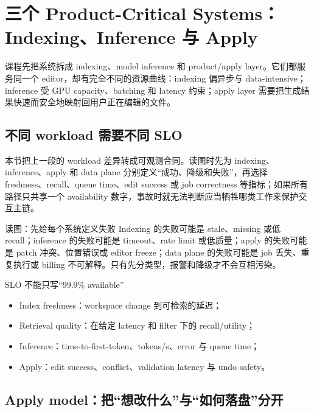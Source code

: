 \section{三个 Product-Critical Systems：Indexing、Inference 与 Apply}

课程先把系统拆成 indexing、model inference 和 product/apply layer。它们都服务同一个 editor，却有完全不同的资源曲线：indexing 偏异步与 data-intensive；inference 受 GPU capacity、batching 和 latency 约束；apply layer 需要把生成结果快速而安全地映射回用户正在编辑的文件。

\subsection{不同 workload 需要不同 SLO}

本节把上一段的 workload 差异转成可观测合同。读图时先为 indexing、inference、apply 和 data plane 分别定义“成功、降级和失败”，再选择 freshness、recall、queue time、edit success 或 job correctness 等指标；如果所有路径只共享一个 availability 数字，事故时就无法判断应当牺牲哪类工作来保护交互主链。


\begin{knowledgebox}{读图：先给每个系统定义失败}
Indexing 的失败可能是 stale、missing 或低 recall；inference 的失败可能是 timeout、rate limit 或低质量；apply 的失败可能是 patch 冲突、位置错误或 editor freeze；data plane 的失败可能是 job 丢失、重复执行或 billing 不可解释。只有先分类型，报警和降级才不会互相污染。
\end{knowledgebox}

\begin{importantbox}{SLO 不能只写“99.9\% available”}
\begin{itemize}
  \item Index freshness：workspace change 到可检索的延迟；
  \item Retrieval quality：在给定 latency 和 filter 下的 recall/utility；
  \item Inference：time-to-first-token、tokens/s、error 与 queue time；
  \item Apply：edit success、conflict、validation latency 与 undo safety。
\end{itemize}
\end{importantbox}

\subsection{Apply model：把“想改什么”与“如何落盘”分开}

